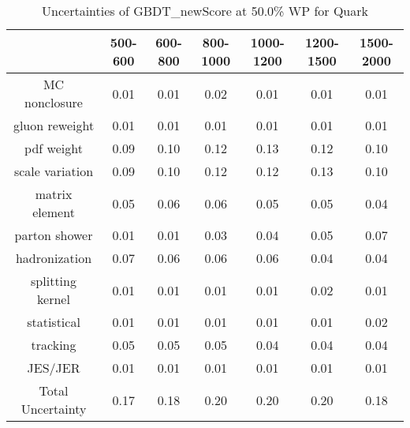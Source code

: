\begin{table}
\centering
\caption{Uncertainties of GBDT_newScore at 50.0\% WP for Quark}
\label{tab:syst_GBDT_newScore_0.5_Quark}
\begin{tabular}{ccccccc}
\toprule
{} &  500-600 &  600-800 &  800-1000 &  1000-1200 &  1200-1500 &  1500-2000 \\
\midrule
MC nonclosure     &     0.01 &     0.01 &      0.02 &       0.01 &       0.01 &       0.01 \\
gluon reweight    &     0.01 &     0.01 &      0.01 &       0.01 &       0.01 &       0.01 \\
pdf weight        &     0.09 &     0.10 &      0.12 &       0.13 &       0.12 &       0.10 \\
scale variation   &     0.09 &     0.10 &      0.12 &       0.12 &       0.13 &       0.10 \\
matrix element    &     0.05 &     0.06 &      0.06 &       0.05 &       0.05 &       0.04 \\
parton shower     &     0.01 &     0.01 &      0.03 &       0.04 &       0.05 &       0.07 \\
hadronization     &     0.07 &     0.06 &      0.06 &       0.06 &       0.04 &       0.04 \\
splitting kernel  &     0.01 &     0.01 &      0.01 &       0.01 &       0.02 &       0.01 \\
statistical       &     0.01 &     0.01 &      0.01 &       0.01 &       0.01 &       0.02 \\
tracking          &     0.05 &     0.05 &      0.05 &       0.04 &       0.04 &       0.04 \\
JES/JER           &     0.01 &     0.01 &      0.01 &       0.01 &       0.01 &       0.01 \\
Total Uncertainty &     0.17 &     0.18 &      0.20 &       0.20 &       0.20 &       0.18 \\
\bottomrule
\end{tabular}
\end{table}
